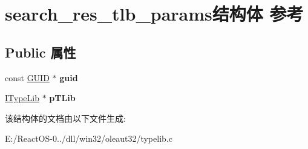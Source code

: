 \hypertarget{structsearch__res__tlb__params}{}\section{search\+\_\+res\+\_\+tlb\+\_\+params结构体 参考}
\label{structsearch__res__tlb__params}
\subsection*{Public 属性}
\begin{DoxyCompactItemize}
\item 
\mbox{\label{structsearch__res__tlb__params_ae35573c0f46464d94e0de3a576aa95c9}} 
const \hyperlink{interface_g_u_i_d}{G\+U\+ID} $\ast$ {\bfseries guid}
\item 
\mbox{\label{structsearch__res__tlb__params_a3ea084149ce470366850ddc7ea695eb6}} 
\hyperlink{interface_i_type_lib}{I\+Type\+Lib} $\ast$ {\bfseries p\+T\+Lib}
\end{DoxyCompactItemize}


该结构体的文档由以下文件生成\+:\begin{DoxyCompactItemize}
\item 
E\+:/\+React\+O\+S-\/0../dll/win32/oleaut32/typelib.\+c\end{DoxyCompactItemize}
